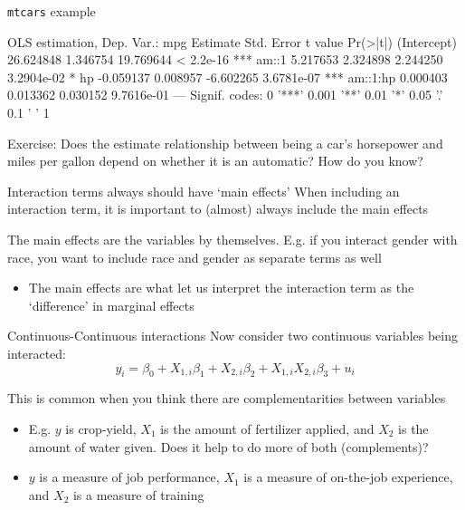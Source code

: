 \documentclass[aspectratio=169,t,11pt,table]{beamer}
\begin{document}
\begin{frame}[fragile]{\texttt{mtcars} example}
  \vspace{-\bigskipamount}
  \begin{codeblock}[{}]
OLS estimation, Dep. Var.: mpg
              Estimate Std. Error   t value   Pr(>|t|)    
(Intercept) 26.624848   1.346754 19.769644  < 2.2e-16 ***
am::1        5.217653   2.324898  2.244250 3.2904e-02 *  
hp          -0.059137   0.008957 -6.602265 3.6781e-07 ***
am::1:hp     0.000403   0.013362  0.030152 9.7616e-01    
---
Signif. codes:  0 '***' 0.001 '**' 0.01 '*' 0.05 '.' 0.1 ' ' 1
  \end{codeblock}

  Exercise: Does the estimate relationship between being a car's horsepower and miles per gallon depend on whether it is an automatic? How do you know?
\end{frame}


\begin{frame}{Interaction terms always should have `main effects'}
  When including an interaction term, it is important to (almost) always include the \alert{main effects}

  \bigskip
  The \alert{main effects} are the variables by themselves. E.g. if you interact gender with race, you want to include race and gender as separate terms as well 
  \begin{itemize}
    \item The main effects are what let us interpret the interaction term as the `difference' in marginal effects
  \end{itemize}
\end{frame}

\begin{frame}{Continuous-Continuous interactions}
  Now consider two continuous variables being interacted:
  $$
    y_i = \beta_0 + X_{1,i} \beta_1 + X_{2,i} \beta_2 + X_{1,i} X_{2,i} \beta_3 + u_i
  $$
  
  \bigskip
  This is common when you think there are complementarities between variables 
  \begin{itemize}
    \item E.g. $y$ is crop-yield, $X_1$ is the amount of fertilizer applied, and $X_2$ is the amount of water given. Does it help to do more of both (complements)?
    
    \item $y$ is a measure of job performance, $X_1$ is a measure of on-the-job experience, and $X_2$ is a measure of training
  \end{itemize}
\end{frame}
\end{document}
